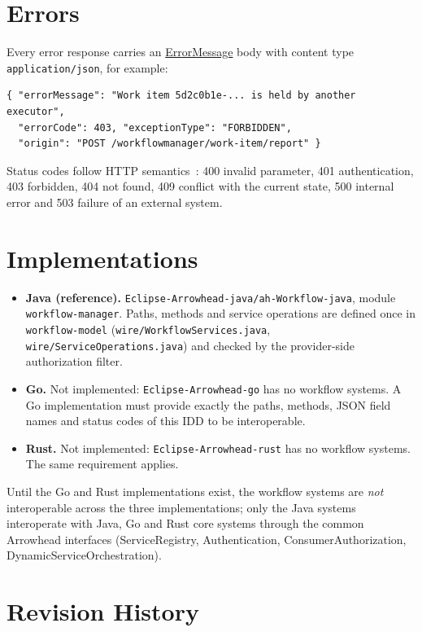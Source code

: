 \documentclass[a4paper]{arrowhead}
\newcommand{\mref}[1]{{\textcolor{ArrowheadPurple}{\hyperref[sec:model:#1]{#1}}}}
\begin{document}
\section{Errors}
\label{sec:errors}
Every error response carries an \mref{ErrorMessage} body with content type \texttt{application/json}, for example:
\begin{lstlisting}
{ "errorMessage": "Work item 5d2c0b1e-... is held by another executor",
  "errorCode": 403, "exceptionType": "FORBIDDEN",
  "origin": "POST /workflowmanager/work-item/report" }
\end{lstlisting}
Status codes follow HTTP semantics~\cite{rfc9110}: 400 invalid parameter, 401 authentication, 403 forbidden, 404 not
found, 409 conflict with the current state, 500 internal error and 503 failure of an external system.


\section{Implementations}
\label{sec:implementations}
\begin{itemize}
\item \textbf{Java (reference).} \texttt{Eclipse-Arrowhead-java/ah-Workflow-java}, module \texttt{workflow-manager}. Paths, methods and service
operations are defined once in \texttt{workflow-model} (\texttt{wire/WorkflowServices.java}, \texttt{wire/ServiceOperations.java}) and checked by the provider-side authorization filter.
\item \textbf{Go.} Not implemented: \texttt{Eclipse-Arrowhead-go} has no workflow systems. A Go implementation must
provide exactly the paths, methods, JSON field names and status codes of this IDD to be interoperable.
\item \textbf{Rust.} Not implemented: \texttt{Eclipse-Arrowhead-rust} has no workflow systems. The same requirement applies.
\end{itemize}
Until the Go and Rust implementations exist, the workflow systems are \emph{not} interoperable across the three
implementations; only the Java systems interoperate with Java, Go and Rust core systems through the common Arrowhead
interfaces (ServiceRegistry, Authentication, ConsumerAuthorization, DynamicServiceOrchestration).


\newpage



\newpage

\section{Revision History}
\end{document}
